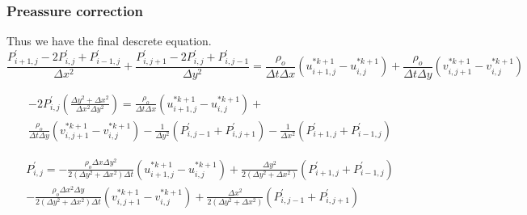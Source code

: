 \documentclass[xcolor=dvipsnames,10pt,aspectratio=169]{beamer}
\begin{document}
\begin{frame}
	\frametitle{Preassure correction}
	Thus we have the final descrete equation.
	\begin{equation}
		\frac{ P^{\prime}_{i + 1, j} - 2 P^{\prime}_{i , j} + P^{\prime}_{i - 1 , j} }{\Delta x^2} + \frac{ P^{\prime}_{i, j + 1} - 2 P^{\prime}_{i , j} + P^{\prime}_{i , j- 1} }{\Delta y^2} = \frac{\rho_o}{ \Delta t \Delta x} \left(u_{i + 1 , j}^{\ast k + 1} - u_{i , j}^{\ast k + 1} \right) + \frac{\rho_o}{ \Delta t \Delta y } \left( v_{i , j + 1}^{\ast k + 1} - v_{i , j}^{\ast k + 1}\right)
	\end{equation}

	\begin{equation}
		\begin{split}
		-2 P^{\prime}_{i , j} \left(   \frac{\Delta y^2 + \Delta x^2}{\Delta x^2 \Delta y^2} \right)  = \frac{\rho_o}{ \Delta t \Delta x} \left(u_{i + 1 , j}^{\ast k + 1} - u_{i , j}^{\ast k + 1} \right) + \\ \frac{\rho_o}{ \Delta t \Delta y } \left( v_{i , j + 1}^{\ast k + 1} - v_{i , j}^{\ast k + 1}\right) - \frac{1}{\Delta y^2} \left(P^{\prime}_{i , j- 1} + P^{\prime}_{i, j + 1} \right) - \frac{1}{\Delta x^2} \left(P^{\prime}_{i + 1, j} +  P^{\prime}_{i - 1 , j}\right)
		\end{split}
	\end{equation}

	\begin{equation}
	\begin{split}
	P^{\prime}_{i , j}  = - \frac{\rho_o \Delta x \Delta y^2 }{ 2 ( \Delta y^2 + \Delta x^2) \Delta t} \left(u_{i + 1 , j}^{\ast k + 1} - u_{i , j}^{\ast k + 1} \right) + \frac{\Delta y^2}{ 2 (\Delta y^2 + \Delta x^2)} \left(P^{\prime}_{i + 1, j} +  P^{\prime}_{i - 1 , j}\right) \\ - \frac{\rho_o \Delta x^2 \Delta y }{ 2 ( \Delta y^2 + \Delta x^2) \Delta t} \left( v_{i , j + 1}^{\ast k + 1} - v_{i , j}^{\ast k + 1}\right) + \frac{\Delta x^2}{ 2 (\Delta y^2 + \Delta x^2)} \left(P^{\prime}_{i , j- 1} + P^{\prime}_{i, j + 1} \right)
	\end{split}
	\end{equation}

\end{frame}
\end{document}
